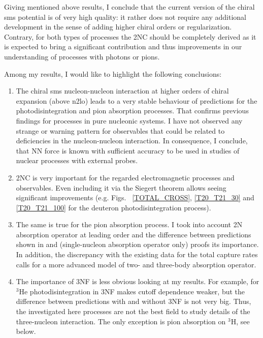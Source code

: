 Giving mentioned above results, I conclude that the current version of 
the chiral \gls{sms} potential is of very high quality:
it rather does not require any additional development in the sense of adding higher chiral orders or regularization.
Contrary, for both types of processes the 2NC should be completely derived as it is expected to bring 
a significant contribution and thus improvements in our understanding of processes
with photons or pions.

Among my results, I would like to highlight the following 
conclusions:

\begin{enumerate}
    \item The chiral \gls{sms} nucleon-nucleon interaction at higher orders of chiral expansion (above \gls{n2lo})
    leads to a very stable behaviour of predictions for the photodisintegration and pion absorption processes.
    That confirms previous findings for processes in pure nucleonic systems.
    I have not observed any strange or warning pattern for observables that could be related to
    deficiencies in the nucleon-nucleon interaction.
    In consequence, I conclude, that NN force is known with sufficient accuracy to be used in studies of 
    nuclear processes with external probes.
    \item 2NC is very important for the regarded electromagnetic processes and observables. Even including it via the Siegert theorem allows seeing significant improvements (e.g. Figs.~ \ref{TOTAL_CROSS}, \ref{T20_T21_30} and \ref{T20_T21_100} for the deuteron photodisintegration process).
    \item The same is true for the pion absorption process. I took into account 2N absorption operator at leading order and the difference between
    predictions shown in  and 
    (single-nucleon absorption operator only) proofs its importance.
    In addition, the discrepancy with the existing data for the total capture rates calls for a more advanced model of two-
    and three-body absorption operator.
    \item The importance of 3NF is less obvious looking at my results.
    For example, for $^3$He photodisintegration in  3NF makes cutoff dependence weaker,
    but the difference between predictions with and without 3NF is not very big.
    Thus, the investigated here processes are not the best field to study details
    of the three-nucleon interaction.
    The only exception is pion absorption on $^3$H, see below.

\end{enumerate}
